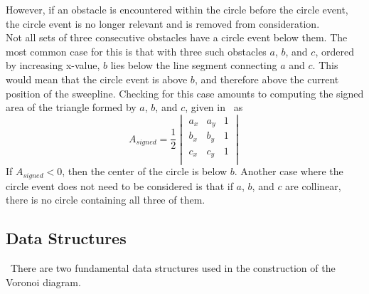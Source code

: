 \documentclass[conference]{IEEEtran}
\begin{document}
\indent However, if an obstacle is encountered within the circle before the
circle event, the circle event is no longer relevant and is removed from consideration.\\
\indent Not all sets of three consecutive obstacles have a circle event below them.
The most common case for this is that with three such obstacles $a$, $b$, and $c$,
ordered by increasing x-value, $b$ lies below the line segment connecting $a$ and
$c$. This would mean that the circle event is above $b$, and therefore above the
current position of the sweepline. Checking for this case amounts to computing the
signed area of the triangle formed by $a$, $b$, and $c$, given in~\cite{schaal} as
\begin{equation}
    A_{signed}=\frac{1}{2}
    \begin{vmatrix}
    a_{x} & a_{y} & 1\\
    b_{x} & b_{y} & 1\\
    c_{x} & c_{y} & 1\\
    \end{vmatrix}
\end{equation}
If $A_{signed}<0$, then the center of the circle is below $b$.
Another case where the circle event does not need to be considered is that if
$a$, $b$, and $c$ are collinear, there is no circle containing all three of them.

\subsection{Data Structures}
\noindent\ There are two fundamental data structures used in the construction of the Voronoi
diagram.
\end{document}
